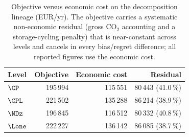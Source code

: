 \begin{table}[t]
\centering
\caption{Objective versus economic cost on the decomposition lineage (EUR/yr). The objective
carries a systematic non-economic residual (gross CO$_2$ accounting and a storage-cycling
penalty) that is near-constant across levels and cancels in every bias/regret difference; all
reported figures use the economic cost.}
\label{tab:objdecomp}
\begin{tabular}{lrrr}
\hline
Level & Objective & Economic cost & Residual \\
\hline
$\CP$   & 195\,994 & 115\,551 & 80\,443 (41.0\,\%) \\
$\CPL$  & 221\,502 & 135\,288 & 86\,214 (38.9\,\%) \\
$\NDz$  & 196\,845 & 116\,512 & 80\,332 (40.8\,\%) \\
$\Lone$ & 222\,227 & 136\,142 & 86\,085 (38.7\,\%) \\
\hline
\end{tabular}
\end{table}
